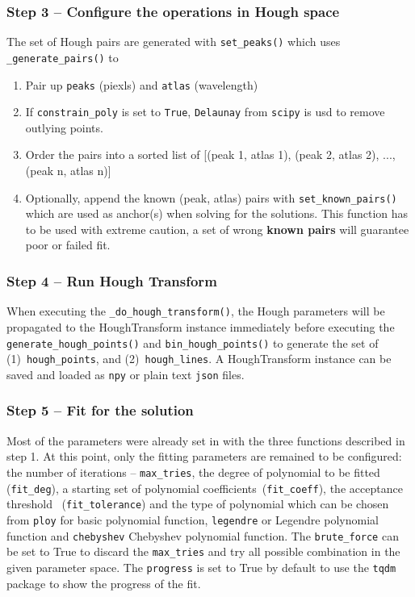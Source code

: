 \documentclass{aa}
\begin{document}
\subsubsection*{Step 3 -- Configure the operations in Hough space}
The set of Hough pairs are generated with \texttt{set\_peaks()} which uses
\texttt{\_generate\_pairs()} to
\begin{enumerate}
    \item Pair up \texttt{peaks} (piexls) and \texttt{atlas} (wavelength)
    \item If \texttt{constrain\_poly} is set to \texttt{True},
        \texttt{Delaunay} from \texttt{scipy} is usd to remove outlying points.
    \item Order the pairs into a sorted list of [(peak 1, atlas 1),
        (peak 2, atlas 2), ..., (peak n, atlas n)]
    \item Optionally, append the known (peak, atlas) pairs with
        \texttt{set\_known\_pairs()} which are used as anchor(s) when solving
            for the solutions. This function has to be used with extreme
            caution, a set of wrong \textbf{known pairs} will guarantee
            poor or failed fit.
\end{enumerate}

\subsubsection*{Step 4 -- Run Hough Transform}
When executing the \texttt{\_do\_hough\_transform()}, the Hough parameters
will be propagated to the HoughTransform instance immediately before
executing the \texttt{generate\_hough\_points()} and
\texttt{bin\_hough\_points()} to generate the set of 
(1)~\texttt{hough\_points}, and (2)~\texttt{hough\_lines}. A HoughTransform
instance can be saved and loaded as \texttt{npy} or plain text \texttt{json}
files.

\subsubsection*{Step 5 -- Fit for the solution}
Most of the parameters were already set in with the three functions described
in step 1. At this point, only the fitting parameters are remained to be
configured: the number of iterations -- \texttt{max\_tries}, the degree of
polynomial to be fitted (\texttt{fit\_deg}), a starting set of polynomial
coefficients~(\texttt{fit\_coeff}), the acceptance threshold~
(\texttt{fit\_tolerance}) and the type of polynomial which can be chosen
from \texttt{ploy} for basic polynomial function, \texttt{legendre} or Legendre
polynomial function and \texttt{chebyshev} Chebyshev polynomial function. The
\texttt{brute\_force} can be set to True to discard the \texttt{max\_tries}
and try all possible combination in the given parameter space. The
\texttt{progress} is set to True by default to use the \texttt{tqdm} package
to show the progress of the fit.
\end{document}
